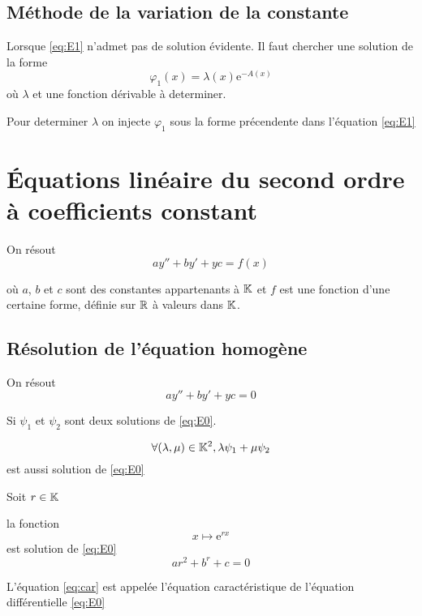\subsection{Méthode de la variation de la constante}

Lorsque \eqref{eq:E1} n'admet pas de solution évidente.
Il faut chercher une solution de la forme
\[
    \varphi_1(x) = \lambda(x)\mathrm{e}^{-A(x)}
\]
où $\lambda$ et une fonction dérivable à determiner.

Pour determiner $\lambda$ on injecte $\varphi_1$ sous la forme
précendente dans l'équation \eqref{eq:E1}

\section{\'Equations linéaire du second ordre à coefficients constant}

On résout
\begin{equation} \label{eq:E}
    a y'' + b y' + y c = f(x)
\end{equation}

où $a$, $b$ et $c$ sont des constantes appartenants à $\mathbb{K}$
et $f$ est une fonction d'une certaine forme, définie sur $\mathbb{R}$
à valeurs dans $\mathbb{K}$.

\subsection{Résolution de l'équation homogène}

On résout
\begin{equation} \label{eq:E0}
    a y'' + b y' + y c = 0
\end{equation}

\begin{prp}
Si $\psi_1$ et $\psi_2$ sont deux solutions de \eqref{eq:E0}.

\[
    \forall (\lambda, \mu) \in \mathbb{K}^2, \lambda \psi_1 + \mu \psi_2
\]
est aussi solution de \eqref{eq:E0}
\end{prp}

\begin{prp}
Soit $r \in \mathbb{K}$

la fonction
\[
    x \mapsto \mathrm{e}^{r x}
\]
 est solution de \eqref{eq:E0} \ssi
\begin{equation} \label{eq:car}
    a r^2 + b^r + c = 0
\end{equation}

L'équation \eqref{eq:car} est appelée l'équation caractéristique
de l'équation différentielle \eqref{eq:E0}
\end{prp}

